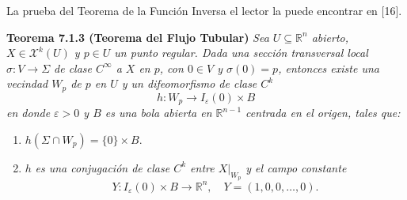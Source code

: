\documentclass[11pt,a4paper]{article}
\theoremstyle{definition}
\theoremstyle{plain}
\theoremstyle{remark}
\newcommand{\restr}[2]{\left.#1\right|_{#2}}
\begin{document}
	La prueba del Teorema de la Función Inversa el lector la puede encontrar en [16].
	
	\noindent \textbf{Teorema 7.1.3 (Teorema del Flujo Tubular)} \textit{Sea $U \subseteq \mathbb{R}^n$ abierto, $X \in \mathcal{X}^k(U)$ y $p \in U$ un punto regular. Dada una sección transversal local $\sigma : V \to \Sigma$ de clase $C^\infty$ a $X$ en $p$, con $0 \in V$ y $\sigma(0) = p$, entonces existe una vecindad $W_p$ de $p$ en $U$ y un difeomorfismo de clase $C^k$}
	\[
	h : W_p \to I_\varepsilon(0) \times B
	\]
	\textit{en donde $\varepsilon > 0$ y $B$ es una bola abierta en $\mathbb{R}^{n-1}$ centrada en el origen, tales que:}
	\begin{enumerate}[label=\roman*)]
		\item $h(\Sigma \cap W_p) = \{0\} \times B$.
		\item $h$ \textit{es una conjugación de clase $C^k$ entre $\restr{X}{W_p}$ y el campo constante}
		\[
		Y : I_\varepsilon(0) \times B \to \mathbb{R}^n, \quad Y = (1, 0, 0, \dots, 0).
		\]
	\end{enumerate}
	
\end{document}
